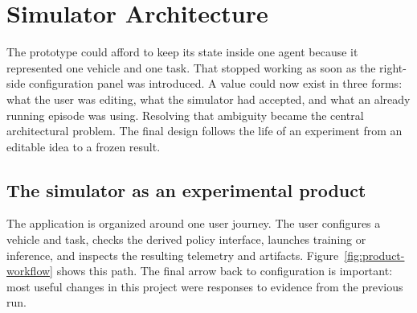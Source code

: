 \chapter{Simulator Architecture}
\label{ch:architecture}

The prototype could afford to keep its state inside one agent because it represented one
vehicle and one task. That stopped working as soon as the right-side configuration panel was
introduced. A value could now exist in three forms: what the user was editing, what the
simulator had accepted, and what an already running episode was using. Resolving that ambiguity
became the central architectural problem. The final design follows the life of an experiment
from an editable idea to a frozen result.

\section{The simulator as an experimental product}

The application is organized around one user journey. The user configures a vehicle and task,
checks the derived policy interface, launches training or inference, and inspects the resulting
telemetry and artifacts. Figure~\ref{fig:product-workflow} shows this path. The final arrow back
to configuration is important: most useful changes in this project were responses to evidence
from the previous run.

